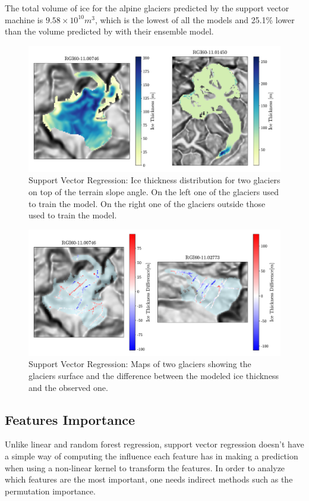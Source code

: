 The total volume of ice for the alpine glaciers predicted by the support vector machine is $9.58 \times 10^{10}m^3$, which is the lowest of all the models and 25.1\% lower than the volume predicted by \citet{Farinotti2019} with their ensemble model.

\begin{figure}[!tp]
	\centering		  
	\includegraphics[width=1.\textwidth]{figures/SVR_thick_map.pdf}
	\caption{Support Vector Regression: Ice thickness distribution for two glaciers on top of the terrain slope angle. On the left one of the glaciers used to train the model. On the right one of the glaciers outside those used to train the model.}
	\label{fig:svr-map}
\end{figure}

\begin{figure}[!tp]
	\centering		  
	\includegraphics[width=1.\textwidth]{figures/SVR_thick_diff_map.pdf}
	\caption{Support Vector Regression: Maps of two glaciers showing the glaciers surface and the difference between the modeled ice thickness and the observed one.}
	\label{fig:svr-diff-map}
\end{figure}

\subsection{Features Importance}\label{svr-features}
Unlike linear and random forest regression, support vector regression doesn't have a simple way of computing the influence each feature has in making a prediction when using a non-linear kernel to transform the features. In order to analyze which features are the most important, one needs indirect methods such as the permutation importance.

